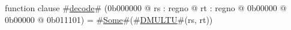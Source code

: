 function clause #\hyperref[zdecode]{decode}# (0b000000 @ rs : regno @ rt : regno @ 0b00000 @ 0b00000 @ 0b011101) =
  #\hyperref[zSome]{Some}#(#\hyperref[zDMULTU]{DMULTU}#(rs, rt))
